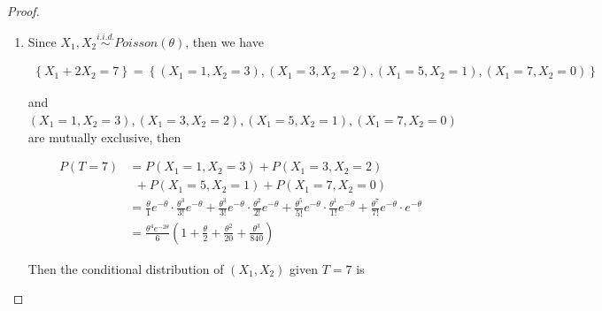 \documentclass[a4paper, 11pt]{article}
\begin{document}
\begin{proof}
\begin{enumerate}[label=(\alph*)]
	\item  Since $X_1,X_2\stackrel{i.i.d.}{\sim }Poisson (\theta)$, then we have 
	
	\begin{align*}
	\left	\lbrace X_1+2X_2=7 \right\rbrace= \left\lbrace (X_1=1,X_2=3), (X_1=3,X_2=2),(X_1=5,X_2=1),(X_1=7,X_2=0)\right\rbrace
	\end{align*}
	
	and $(X_1=1,X_2=3), (X_1=3,X_2=2),(X_1=5,X_2=1),(X_1=7,X_2=0)$ are mutually exclusive, then 
	
	\begin{align*}
	P\left(T=7\right)& =P\left(X_1=1,X_2=3\right)+P \left(X_1=3,X_2=2\right)\\&\ \ +P\left(X_1=5,X_2=1\right)+P(X_1=7,X_2=0)\\
	& = \frac{\theta}{1}e^{-\theta}\cdot \frac{\theta^3}{3!}e^{-\theta}+ \frac{\theta^3}{3!}e^{-\theta}\cdot \frac{\theta^2}{2!}e^{-\theta}+\frac{\theta^5}{5!}e^{-\theta}\cdot \frac{\theta^1}{1!}e^{-\theta}+ \frac{\theta^7}{7!}e^{-\theta}\cdot e^{-\theta}\\
	& = \frac{\theta^4e^{-2\theta}}{6}\left(1+ \frac{\theta}{2}+\frac{\theta^2}{20}+\frac{\theta^3}{840}\right)
	\end{align*}
	
	Then the conditional distribution of $(X_1,X_2)$ given $T=7$ is 
	

\end{enumerate}
\end{proof}
\end{document}

